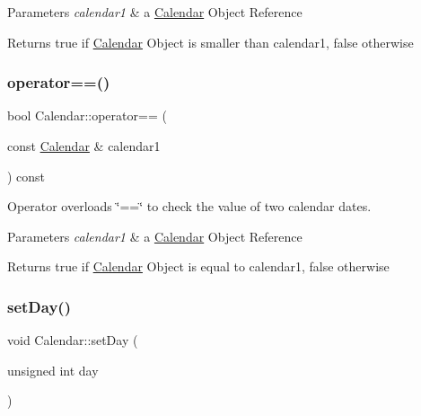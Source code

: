 \begin{DoxyParams}{Parameters}
{\em calendar1} & a \hyperlink{class_calendar}{Calendar} Object Reference \\
\hline
\end{DoxyParams}
\begin{DoxyReturn}{Returns}
true if \hyperlink{class_calendar}{Calendar} Object is smaller than calendar1, false otherwise 
\end{DoxyReturn}
\mbox{\label{class_calendar_a25fdea266ecbfdf5e5dc0bde770b51c0}} 
\subsubsection{\texorpdfstring{operator==()}{operator==()}}
{\footnotesize\ttfamily bool Calendar\+::operator== (\begin{DoxyParamCaption}\item[{const \hyperlink{class_calendar}{Calendar} \&}]{calendar1 }\end{DoxyParamCaption}) const}



Operator overloads \char`\"{}==\char`\"{} to check the value of two calendar dates. 


\begin{DoxyParams}{Parameters}
{\em calendar1} & a \hyperlink{class_calendar}{Calendar} Object Reference \\
\hline
\end{DoxyParams}
\begin{DoxyReturn}{Returns}
true if \hyperlink{class_calendar}{Calendar} Object is equal to calendar1, false otherwise 
\end{DoxyReturn}
\mbox{\label{class_calendar_a84834635f8245a0b2f9ae69b4f31382e}} 
\subsubsection{\texorpdfstring{set\+Day()}{setDay()}}
{\footnotesize\ttfamily void Calendar\+::set\+Day (\begin{DoxyParamCaption}\item[{unsigned int}]{day }\end{DoxyParamCaption})}



